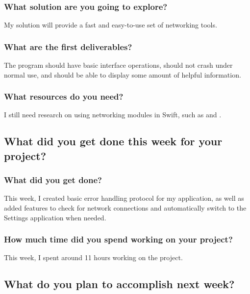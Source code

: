 \documentclass[letterpaper]{article}            %
\begin{document}
\subsubsection{What solution are you going to explore?}

My solution will provide a fast and easy-to-use set of networking tools.

\subsubsection{What are the first deliverables?}

The program should have basic interface operations, should not crash under normal use, and should be able to display some amount of helpful information.

\subsubsection{What resources do you need?}

I still need research on using networking modules in Swift, such as  and .


\subsection{What did you get done this week for your project?}

\subsubsection{What did you get done?}

This week, I created basic error handling protocol for my application, as well as added features to check for network connections and automatically switch to the Settings application when needed.

\subsubsection{How much time did you spend working on your project?}

This week, I spent around 11 hours working on the project.


\subsection{What do you plan to accomplish next week?}
\end{document}

